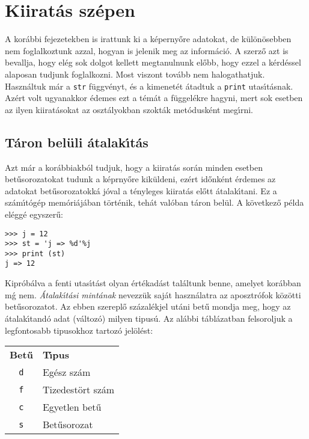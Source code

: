 \appendix
\section{Kiirat\'as sz\'epen}

A kor\'abbi fejezetekben is irattunk ki a k\'eperny\H{o}re adatokat, de k\"ul\"on\"osebben nem foglalkoztunk azzal, hogyan 
is jelenik meg az inform\'aci\'o. A szerz\H{o} azt is bevallja, hogy el\'eg sok dolgot kellett megtanulnunk el\H{o}bb, 
hogy ezzel a k\'erd\'essel alaposan tudjunk foglalkozni. Most viszont tov\'abb nem halogathatjuk. Haszn\'altuk m\'ar a 
{\tt str} f\"uggv\'enyt, \'es a kimenet\'et \'atadtuk a {\tt print} utas\'{\i}t\'asnak. Az\'ert volt ugyanakkor \'edemes ezt 
a t\'em\'at a f\"uggel\'ekre hagyni, mert sok esetben az ilyen kiirat\'asokat az oszt\'alyokban szokt\'ak met\'odusk\'ent 
meg\'{\i}rni. 

\subsection{T\'aron bel\"uli \'atalak\'{\i}t\'as}

Azt m\'ar a kor\'abbiakb\'ol tudjuk, hogy a kiirat\'as sor\'an minden esetben bet\H{u}\-so\-ro\-za\-to\-kat tudunk a 
k\'eprny\H{o}re kik\"uldeni, ez\'ert id\H{o}nk\'ent \'erdemes az adatokat bet\H{u}sorozatokk\'a j\'oval a t\'enyleges 
kiirat\'as el\H{o}tt \'atalak\'{\i}tani. Ez a sz\'am\'{\i}t\'og\'ep mem\'ori\'aj\'aban t\"ort\'enik, teh\'at val\'oban 
t\'aron bel\"ul. A k\"ovetkez\H{o} p\'elda el\'egg\'e egyszer\H{u}:

\begin{Verbatim}[fontsize=\small]
>>> j = 12 
>>> st = 'j => %d'%j
>>> print (st)
j => 12
\end{Verbatim}

Kipr\'ob\'alva a fenti utas\'{\i}t\'ast olyan \'ert\'ekad\'ast tal\'altunk benne, amelyet kor\'abban m\'g nem. 
{\sl \'Atalak\'{\i}t\'asi mint\'anak} nevezz\"uk saj\'at haszn\'alatra az aposztr\'ofok k\"oz\"otti bet\H{u}sorozatot. Az 
ebben szerepl\H{o} sz\'azal\'ekjel ut\'ani bet\H{u} mondja meg, hogy az \'atalak\'{\i}tand\'o adat (v\'altoz\'o) milyen 
tipus\'u. Az al\'abbi t\'abl\'azatban felsoroljuk a legfontosabb tipusokhoz tartoz\'o jel\"ol\'est:

\begin{center}
   \begin{tabular}{cl}
      {\bf Bet\H{u}} & {\bf T\'{\i}pus} \\
      {\tt d} & Eg\'esz sz\'am \\
      {\tt f} & Tizedest\"ort sz\'am \\
      {\tt c} & Egyetlen bet\H{u} \\
      {\tt s} & Bet\H{u}sorozat 
   \end{tabular}
\end{center}

